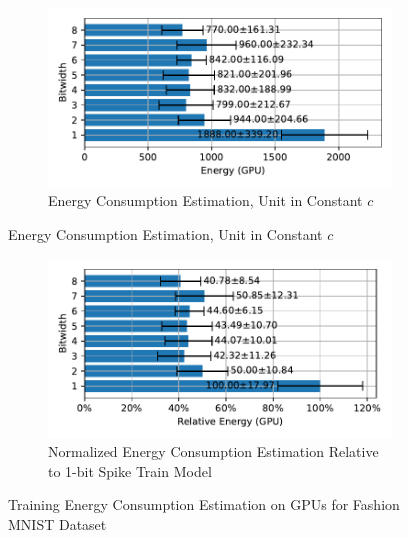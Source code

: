         \begin{figure}[H]
            \centering
            \begin{subfigure}[H]{0.6\textwidth}
                \includegraphics[width=\textwidth]{../standard/FashionMNIST/plots/fashionmnist_train_energy_gpu_horizontal.pdf}
                \caption{Energy Consumption Estimation, Unit in Constant $c$}
            \end{subfigure}
        \end{figure}
        \begin{figure}[H]
            \centering
            \ContinuedFloat
            \begin{subfigure}[H]{0.6\textwidth}
                \includegraphics[width=\textwidth]{../standard/FashionMNIST/plots/fashionmnist_train_relative_energy_gpu_horizontal.pdf}
                \caption{Normalized Energy Consumption Estimation Relative to 1-bit Spike Train Model}
            \end{subfigure}
            \caption{Training Energy Consumption Estimation on GPUs for Fashion MNIST Dataset}
        \end{figure}

    \label{appendix:energy_gpu_mnist}

